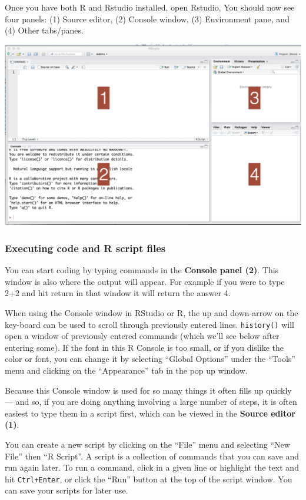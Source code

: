 \documentclass[
]{book}
\begin{document}
Once you have both R and Rstudio installed, open Rstudio. You should now see four panels: (1) Source editor, (2) Console window,
(3) Environment pane, and
(4) Other tabs/panes.

\includegraphics{img/rstudio-panes.png}

\hypertarget{executing-code-and-r-script-files}{%
\subsubsection*{Executing code and R script files}\label{executing-code-and-r-script-files}}

You can start coding by typing commands in the \textbf{Console panel (2)}. This window is also where the output will appear. For example if you were to type 2+2 and hit return in that window it will return the answer 4.

When using the Console window in RStudio or R, the up and down-arrow on the key-board can be used to scroll through previously entered lines. \texttt{history()} will open a window of previously entered commands (which we'll see below after entering some). If the font in this R Console is too small, or if you dislike the color or font, you can change it by selecting ``Global Options'' under the ``Tools'' menu and clicking on the ``Appearance'' tab in the pop up window.

Because this Console window is used for so many things it often fills up quickly --- and so, if you are doing anything involving a large number of steps, it is often easiest to type them in a script first, which can be viewed in the \textbf{Source editor (1)}.

You can create a new script by clicking on the ``File'' menu and selecting ``New File'' then ``R Script''. A script is a collection of commands that you can save and run again later. To run a command, click in a given line or highlight the text and hit \texttt{Ctrl+Enter}, or click the ``Run'' button at the top of the script window. You can save your scripts for later use.
\end{document}
